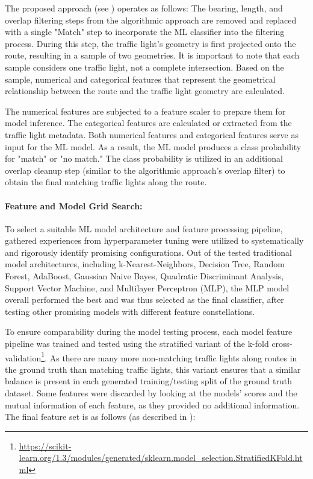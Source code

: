 The proposed approach (see ) operates as follows: The bearing, length, and overlap filtering steps from the algorithmic approach are removed and replaced with a single "Match" step to incorporate the ML classifier into the filtering process. During this step, the traffic light's geometry is first projected onto the route, resulting in a sample of two geometries. It is important to note that each sample considers one traffic light, not a complete intersection. Based on the sample, numerical and categorical features that represent the geometrical relationship between the route and the traffic light geometry are calculated.

The numerical features are subjected to a feature scaler to prepare them for model inference. The categorical features are calculated or extracted from the traffic light metadata. Both numerical features and categorical features serve as input for the ML model. As a result, the ML model produces a class probability for "match" or "no match." The class probability is utilized in an additional overlap cleanup step (similar to the algorithmic approach's overlap filter) to obtain the final matching traffic lights along the route.

\paragraph{Feature and Model Grid Search:} To select a suitable ML model architecture and feature processing pipeline, gathered experiences from hyperparameter tuning were utilized to systematically and rigorously identify promising configurations. Out of the tested traditional model architectures, including k-Nearest-Neighbors, Decision Tree, Random Forest, AdaBoost, Gaussian Naive Bayes, Quadratic Discriminant Analysis, Support Vector Machine, and Multilayer Perceptron (MLP), the MLP model overall performed the best and was thus selected as the final classifier, after testing other promising models with different feature constellations. 

To ensure comparability during the model testing process, each model feature pipeline was trained and tested using the stratified variant of the k-fold cross-validation\footnote{\url{https://scikit-learn.org/1.3/modules/generated/sklearn.model_selection.StratifiedKFold.html}}. As there are many more non-matching traffic lights along routes in the ground truth than matching traffic lights, this variant ensures that a similar balance is present in each generated training/testing split of the ground truth dataset. Some features were discarded by looking at the models' scores and the mutual information of each feature, as they provided no additional information. The final feature set is as follows (as described in \cite{matthes2023geo}):

